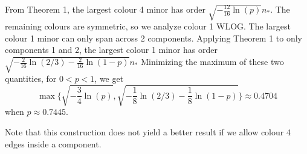 \documentclass{article}
\begin{document}
From Theorem 1, the largest colour 4 minor has order $\sqrt{-\frac{12}{16}\ln(p)} n_*$. The remaining colours are symmetric, so we analyze colour 1 WLOG. The largest colour 1 minor can only span across 2 components. Applying Theorem 1 to only components 1 and 2, the largest colour 1 minor has order $\sqrt{-\frac2{16} \ln(2/3)-\frac2{16} \ln(1-p)} n_*$ Minimizing the maximum of these two quantities, for $0 < p < 1$, we get $$\max\{\sqrt{-\frac34\ln(p)}, \sqrt{-\frac18 \ln(2/3) - \frac18 \ln(1-p)}\} \approx 0.4704$$ when $p \approx 0.7445$.

Note that this construction does not yield a better result if we allow colour 4 edges inside a component.
\end{document}
